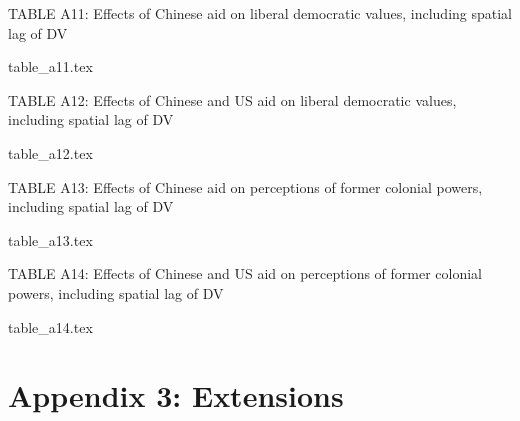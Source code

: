 \documentclass[9pt]{article}
\begin{document}
\newpage %

\setlength{\tabcolsep}{5pt}
\begin{table}[H]
\caption{TABLE A11: Effects of Chinese aid on liberal democratic values, including spatial lag of DV}
\label{reg}
\centering
{table_a11.tex}
\end{table}

\setlength{\tabcolsep}{5pt}
\begin{table}[H]
\caption{TABLE A12: Effects of Chinese and US aid on liberal democratic values, including spatial lag of DV}
\label{reg}
\centering
{table_a12.tex}
\end{table}

\newpage %

\setlength{\tabcolsep}{5pt}
\begin{table}[H]
\caption{TABLE A13: Effects of Chinese aid on perceptions of former colonial powers, including spatial lag of DV}
\label{reg}
\centering
{table_a13.tex}
\end{table}

\setlength{\tabcolsep}{5pt}
\begin{table}[H]
\caption{TABLE A14: Effects of Chinese and US aid on perceptions of former colonial powers, including spatial lag of DV}
\label{reg}
\centering
{table_a14.tex}
\end{table}

\newpage
\section{Appendix 3: Extensions}
\end{document}
